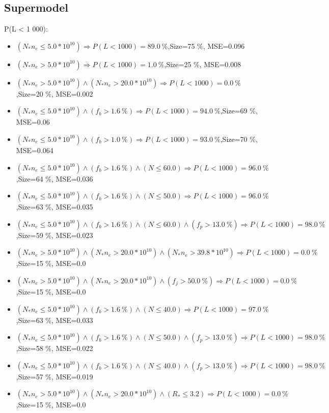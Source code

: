 \documentclass[numbered]{CSL}
\begin{document}
\subsection{Supermodel}
P(L < 1 000):
\begin{itemize}
\item $(N_* n_e \leq 5.0 * 10^{10}) \Rightarrow P(L < 1 000) = 89.0~\%$,\hfill Size=75 \%, MSE=0.096
\item $(N_* n_e > 5.0 * 10^{10}) \Rightarrow P(L < 1 000) = 1.0~\%$,\hfill Size=25 \%, MSE=0.008
\item $(N_* n_e > 5.0 * 10^{10}) \land (N_* n_e > 20.0 * 10^{10}) \Rightarrow P(L < 1 000) = 0.0~\%$,\hfill Size=20 \%, MSE=0.002
\item $(N_* n_e \leq 5.0 * 10^{10}) \land (f_b > 1.6~\%) \Rightarrow P(L < 1 000) = 94.0~\%$,\hfill Size=69 \%, MSE=0.06
\item $(N_* n_e \leq 5.0 * 10^{10}) \land (f_b > 1.0~\%) \Rightarrow P(L < 1 000) = 93.0~\%$,\hfill Size=70 \%, MSE=0.064
\item $(N_* n_e \leq 5.0 * 10^{10}) \land (f_b > 1.6~\%) \land (N \leq 60.0) \Rightarrow P(L < 1 000) = 96.0~\%$,\hfill Size=64 \%, MSE=0.036
\item $(N_* n_e \leq 5.0 * 10^{10}) \land (f_b > 1.6~\%) \land (N \leq 50.0) \Rightarrow P(L < 1 000) = 96.0~\%$,\hfill Size=63 \%, MSE=0.035
\item $(N_* n_e \leq 5.0 * 10^{10}) \land (f_b > 1.6~\%) \land (N \leq 60.0) \land (f_p > 13.0~\%) \Rightarrow P(L < 1 000) = 98.0~\%$,\hfill Size=59 \%, MSE=0.023
\item $(N_* n_e > 5.0 * 10^{10}) \land (N_* n_e > 20.0 * 10^{10}) \land (N_* n_e > 39.8 * 10^{10}) \Rightarrow P(L < 1 000) = 0.0~\%$,\hfill Size=15 \%, MSE=0.0
\item $(N_* n_e > 5.0 * 10^{10}) \land (N_* n_e > 20.0 * 10^{10}) \land (f_j > 50.0~\%) \Rightarrow P(L < 1 000) = 0.0~\%$,\hfill Size=15 \%, MSE=0.0
\item $(N_* n_e \leq 5.0 * 10^{10}) \land (f_b > 1.6~\%) \land (N \leq 40.0) \Rightarrow P(L < 1 000) = 97.0~\%$,\hfill Size=63 \%, MSE=0.033
\item $(N_* n_e \leq 5.0 * 10^{10}) \land (f_b > 1.6~\%) \land (N \leq 50.0) \land (f_p > 13.0~\%) \Rightarrow P(L < 1 000) = 98.0~\%$,\hfill Size=58 \%, MSE=0.022
\item $(N_* n_e \leq 5.0 * 10^{10}) \land (f_b > 1.6~\%) \land (N \leq 40.0) \land (f_p > 13.0~\%) \Rightarrow P(L < 1 000) = 98.0~\%$,\hfill Size=57 \%, MSE=0.019
\item $(N_* n_e > 5.0 * 10^{10}) \land (N_* n_e > 20.0 * 10^{10}) \land (R_* \leq 3.2) \Rightarrow P(L < 1 000) = 0.0~\%$,\hfill Size=15 \%, MSE=0.0

\end{itemize}
\end{document}
